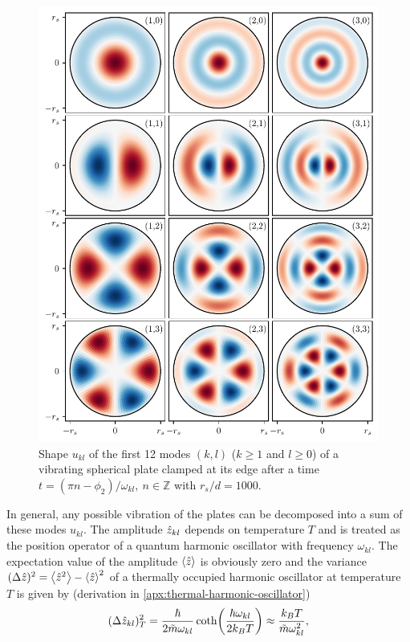 \begin{figure}[!htbp]
  \centering
  \includegraphics[width=\textwidth]{./../figures/vibrations/vibrational-modes-rd_bu.pdf}
  \caption{Shape $u_{kl}$ of the first 12 modes $(k,l)$ ($k \geq 1$ and $l \geq 0$) of a vibrating spherical plate clamped at its edge after a time $t=(\pi n - \phi_2) / \omega_{kl},\ n\in\mathbb{Z}$ with $r_s/d = 1000$.}
  \label{fig:5:vibrational-modes}
\end{figure}
In general, any possible vibration of the plates can be decomposed into a sum of these modes $u_{kl}$.
The amplitude $\hat{z}_{kl}$ depends on temperature $T$ and is treated as the position operator of a quantum harmonic oscillator with frequency $\omega_{kl}$.
The expectation value of the amplitude $\left\langle\hat{z}\right\rangle$ is obviously zero and the variance $(\Delta \hat{z})^2 = \left\langle\hat{z}^2\right\rangle - \left\langle\hat{z}\right\rangle^2$ of a thermally occupied harmonic oscillator at temperature $T$ is given by (derivation in \cref{apx:thermal-harmonic-oscillator})
\begin{equation}\label{eq:5:amplitude-variance}
  (\Delta \hat{z}_{kl})^2_T = \frac{\hbar}{2\tilde{m}\omega_{kl}}\coth(\frac{\hbar \omega_{kl}}{2k_BT}) \approx \frac{k_B T}{\tilde{m}\omega_{kl}^2} ,
\end{equation}
